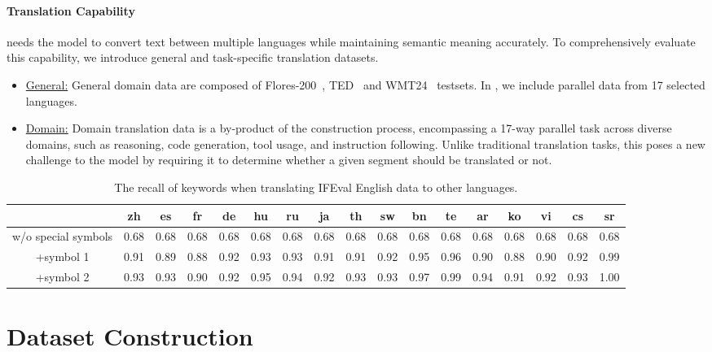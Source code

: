 \paragraph{Translation Capability} needs the model to convert text between multiple languages while maintaining semantic meaning accurately. To comprehensively evaluate this capability, we introduce general and task-specific translation datasets.
\begin{itemize}[nosep,itemsep=1pt,leftmargin=0.1cm]
    \item \underline{General:} General domain data are composed of Flores-200~\cite{costa2022no}, TED~\cite{cettolo-etal-2012-wit3} and WMT24~\cite{kocmi2024findings} testsets. In \name, we include parallel data from 17 selected languages.
    \item \underline{Domain:} Domain translation data is a by-product of the \name construction process, encompassing a 17-way parallel task across diverse domains, such as reasoning, code generation, tool usage, and instruction following. Unlike traditional translation tasks, this poses a new challenge to the model by requiring it to determine whether a given segment should be translated or not.
\end{itemize}


\begin{table*}[!t]
    \caption{The recall of keywords when translating IFEval English data to other languages.}
    \label{tab:recall}
    \vskip 0.15in
    \centering
    \small
    \setlength{\tabcolsep}{4pt}
    \begin{tabular}{ccccccccccccccccc}
    \toprule
    & zh & es & fr & de & hu & ru & ja & th & sw & bn & te & ar & ko & vi & cs & sr \\
    \midrule
    w/o special symbols & 0.68 & 0.68 & 0.68 & 0.68 & 0.68 & 0.68 & 0.68 & 0.68 & 0.68 & 0.68 & 0.68 & 0.68 & 0.68 & 0.68 & 0.68 & 0.68 \\
    +symbol 1 & 0.91 & 0.89 & 0.88 & 0.92 & 0.93 & 0.93 & 0.91 & 0.91 & 0.92 & 0.95 & 0.96 & 0.90 & 0.88 & 0.90 & 0.92 & 0.99 \\
    +symbol 2 & 0.93 & 0.93 & 0.90 & 0.92 & 0.95 & 0.94 & 0.92 & 0.93 & 0.93 & 0.97 & 0.99 & 0.94 & 0.91 & 0.92 & 0.93 & 1.00 \\
    \bottomrule
    \end{tabular}
\end{table*}


\section{Dataset Construction}
\label{sec:append_if_keywords}
